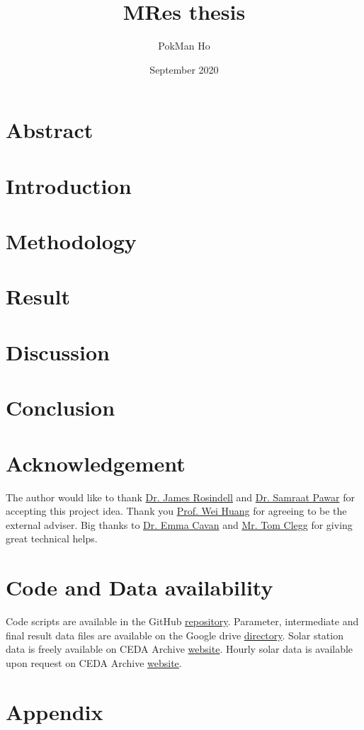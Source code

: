 \documentclass[a4paper,11pt]{article}
\title{MRes thesis}
\author{PokMan Ho}
\date{September 2020}
\begin{document}
\maketitle

\section{Abstract}


\section{Introduction}


\section{Methodology}


\section{Result}


\section{Discussion}


\section{Conclusion}


\section{Acknowledgement}
The author would like to thank \href{mailto:j.rosindell@imperial.ac.uk}{Dr. James Rosindell} and \href{mailto:s.pawar@imperial.ac.uk}{Dr. Samraat Pawar} for accepting this project idea.  Thank you \href{mailto:wei.huang@eng.ox.ac.uk}{Prof. Wei Huang} for agreeing to be the external adviser.  Big thanks to \href{mailto:e.cavan@imperial.ac.uk}{Dr. Emma Cavan} and \href{mailto:t.clegg17@imperial.ac.uk}{Mr. Tom Clegg} for giving great technical helps.

\section{Code and Data availability}
Code scripts are available in the GitHub \href{https://github.com/ph-u/Project}{repository}.  Parameter, intermediate and final result data files are available on the Google drive \href{https://drive.google.com/drive/folders/1tp2miPXis7bn-km1THC3ZaRHSRXQGCi5?usp=sharing}{directory}.  Solar station data is freely available on CEDA Archive \href{http://archive.ceda.ac.uk/midas_stations/google_earth/}{website}.  Hourly solar data is available upon request on CEDA Archive \href{https://catalogue.ceda.ac.uk/uuid/220a65615218d5c9cc9e4785a3234bd0}{website}.

\nocite{*}\printbibliography

\section{Appendix}

\end{document}
